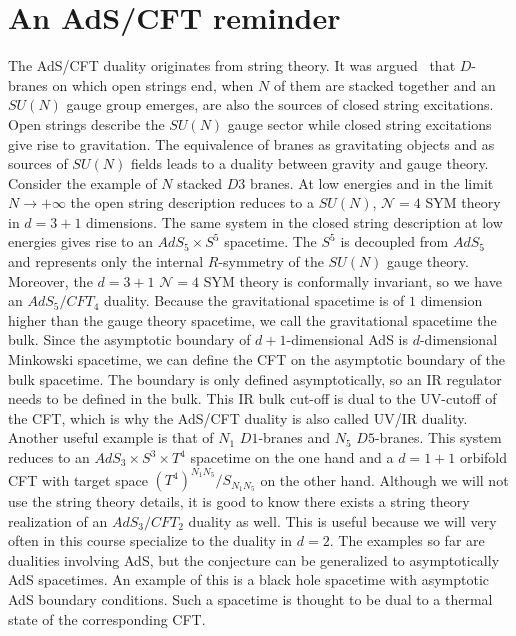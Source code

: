 \documentclass{PoS}
\newcommand{\LF}{\left(}
\newcommand{\RF}{\right)}
\begin{document}
\section{An AdS/CFT reminder}
The AdS/CFT duality originates from string theory. It was argued~\cite{Maldacena:1997re,Polchinski:1995mt} that $D$-branes on which open strings end, when $N$ of them are stacked together and an $SU(N)$ gauge group emerges, are also the sources of closed string excitations. Open strings describe the $SU(N)$ gauge sector while closed string excitations give rise to gravitation. The equivalence of branes as gravitating objects and as sources of $SU(N)$ fields leads to a duality between gravity and gauge theory. Consider the example of $N$ stacked $D3$ branes. At low energies and in the limit $N\rightarrow + \infty$ the open string description reduces to a $SU(N)$, $\mathcal{N}=4$ SYM theory in $d=3+1$ dimensions. The same system in the closed string description at low energies gives rise to an $AdS_5\times S^5$ spacetime. The $S^5$ is decoupled from $AdS_5$ and represents only the internal $R$-symmetry of the $SU(N)$ gauge theory. Moreover, the $d=3+1$ $\mathcal{N}=4$ SYM theory is conformally invariant, so we have an $AdS_5/CFT_4$ duality. Because the gravitational spacetime is of $1$ dimension higher than the gauge theory spacetime, we call the gravitational spacetime the bulk. Since the asymptotic boundary of $d+1$-dimensional AdS is $d$-dimensional Minkowski spacetime, we can define the CFT on the asymptotic boundary of the bulk spacetime. The boundary is only defined asymptotically, so an IR regulator needs to be defined in the bulk. This IR bulk cut-off is dual to the UV-cutoff of the CFT, which is why the AdS/CFT duality is also called UV/IR duality.\\
Another useful example is that of $N_1$ $D1$-branes and $N_5$ $D5$-branes. This system reduces to an $AdS_3\times S^3\times T^4$ spacetime on the one hand and a $d=1+1$ orbifold CFT with target space \newline $\LF T^4\RF^{N_1N_5}/S_{N_1N_5}$ on the other hand. Although we will not use the string theory details, it is good to know there exists a string theory realization of an $AdS_3/CFT_2$ duality as well. This is useful because we will very often in this course specialize to the duality in $d=2$. The examples so far are dualities involving AdS, but the conjecture can be generalized to asymptotically AdS spacetimes. An example of this is a black hole spacetime with asymptotic AdS boundary conditions. Such a spacetime is thought to be dual to a thermal state of the corresponding CFT.\\
\end{document}
